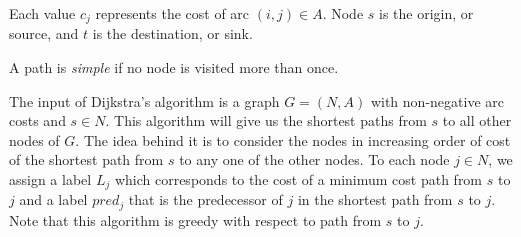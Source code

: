 \documentclass[12pt, a4paper]{report}
\newtheorem[style=M,bodystyle=\normalfont]{proposition}{Proposition}
\newtheorem[style=M,bodystyle=\normalfont]{theorem}{Theorem}
\newtheorem[style=M,bodystyle=\normalfont]{corollary}{Corollary}
\newtheorem[style=M,bodystyle=\normalfont]{lemma}{Lemma}
\newtheorem[style=M,bodystyle=\normalfont]{definition}{Definition}
\begin{document}
    Each value $c_j$ represents the cost  of arc $(i,j) \in A$. Node $s$ is the origin, or source, and $t$ is the destination, or sink. 
    \begin{definition}
        A path is \emph{simple} if no node is visited more than once. 
    \end{definition}
    The input of Dijkstra's algorithm is a graph $G = (N, A)$ with non-negative arc costs and $s \in N$. This algorithm will give us the shortest paths from $s$ to 
    all other nodes of $G$. The idea behind it is to consider the nodes in increasing order of cost of the shortest path from $s$ to any one of the other nodes. 
    To each node $j \in N$, we assign a label $L_j$ which corresponds to the cost of a minimum cost path from $s$ to $j$ and a label $pred_j$ that is the predecessor of $j$ in the
    shortest path from $s$ to $j$. Note that this algorithm is greedy with respect to path from $s$ to $j$. 
\end{document}
